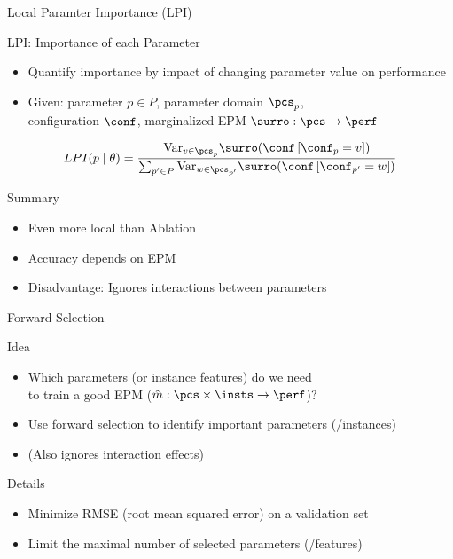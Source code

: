 \begin{frame}[c]{Local Paramter Importance (LPI)~}

\begin{block}{LPI: Importance of each Parameter}
\begin{itemize}
  \item Quantify importance by impact of changing parameter value on performance
  \item Given: parameter $p \in P$, parameter domain $\pcs_p$,\\ configuration $\conf$, marginalized EPM $\surro: \pcs \to \perf $ 
\end{itemize}
\[LPI(p \mid \theta) = \frac{\mathrm{Var}_{v\in\pcs_p}\surro(\conf\left[\conf_p=v\right])}{\sum_{p'\in P}\mathrm{Var}_{w\in\pcs_{p'}}\surro(\conf\left[\conf_{p'}=w\right])}\]
\end{block}

\pause

\begin{block}{Summary}
\begin{itemize}
  \item Even more local than Ablation
  \item Accuracy depends on EPM
  \item Disadvantage: Ignores interactions between parameters 
\end{itemize}
\end{block}

\end{frame}
\begin{frame}[c]{Forward Selection~}

\begin{block}{Idea}
\begin{itemize}
  \item Which parameters (or instance features) do we need \\to train a good EPM ($\hat{m}: \pcs \times \insts \to \perf$)?
  \item Use \alert{forward selection} to identify important parameters (/instances)
  \item (Also ignores interaction effects) 
\end{itemize} 
\end{block}

\pause
\medskip

\begin{block}{Details}
\begin{itemize}
  \item Minimize RMSE (root mean squared error) on a validation set
  \item Limit the maximal number of selected parameters (/features) 
\end{itemize} 
\end{block}

\end{frame}

